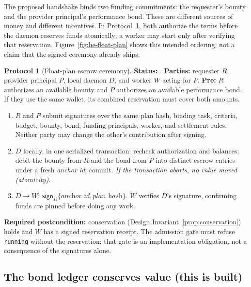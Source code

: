 \documentclass[11pt,a4paper]{article}
\theoremstyle{definition}
\theoremstyle{definition}
\newtheorem{protocol}{Protocol}[section]
\theoremstyle{remark}
\begin{document}
The proposed handshake binds two funding commitments: the requester's bounty
and the provider principal's performance bond. These are different sources of
money and different incentives. In Protocol~\ref{prot:escrow}, both authorize
the terms before the daemon reserves funds atomically; a worker may start only
after verifying that reservation. Figure~\ref{fig:he-float-plan} shows this
intended ordering, not a claim that the signed ceremony already ships.

\begin{protocol}[Float-plan escrow ceremony]\label{prot:escrow}
\textbf{Status:} \Designed{}. \textbf{Parties:} requester $R$, provider principal
$P$, local daemon $D$, and worker $W$ acting for $P$.
\textbf{Pre:} $R$ authorizes an available bounty and $P$ authorizes an available
performance bond. If they use the same wallet, its combined reservation must
cover both amounts.
\begin{enumerate}[leftmargin=2.0em,itemsep=1pt,topsep=2pt]
  \item $R$ and $P$ submit signatures over the same plan hash, binding task,
    criteria, budget, bounty, bond, funding principals, worker, and settlement
    rules. Neither party may change the other's contribution after signing.
  \item $D$ locally, in one serialized transaction:
    recheck authorization and balances; debit the bounty from $R$ and the bond
    from $P$ into distinct escrow entries under a fresh \textit{anchor id};
    commit. \emph{If the transaction aborts,
    no value moved (atomicity).}
  \item $D \to W$: $\mathsf{sign}_D\{\textit{anchor id}, \textit{plan hash}\}$.
    $W$ verifies $D$'s signature, confirming funds are pinned before doing any work.
\end{enumerate}
\textbf{Required postcondition:} conservation (Design Invariant~\ref{prop:conservation})
holds and $W$ has a signed reservation receipt. The admission gate must refuse
\texttt{running} without the reservation; that gate is an implementation
obligation, not a consequence of the signatures alone.
\end{protocol}



\subsection{The bond ledger conserves value (this is built)}
\end{document}
